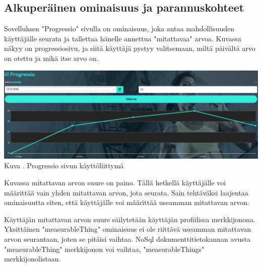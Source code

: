 

\subsection{Alkuperäinen ominaisuus ja parannuskohteet}





Sovelluksen "Progressio"{} sivulla on ominaisuus, 
joka antaa mahdollisuuden käyttäjälle seurata ja tallettaa hänelle annettua "mitattavaa"{} arvoa.
Kuvassa \nextImageCount {} näkyy on progressiosivu, 
ja siitä käyttäjä pystyy valitsemaan, miltä päivältä arvo on otettu ja mikä itse arvo on.
\medskip

\bigskip
\includegraphics[width =15cm]{src/public/progressiosingle.png}\\
Kuva \getImgCount {}. Progressio sivun käyttöliittymä 
\medskip



Kuvassa \theimgCounter {} mitattavan arvon suure on paino. 
% 
Tällä hetkellä käyttäjälle voi määrittää vain yhden mitattavan arvon, jota seurata.
Sain tehtäväksi laajentaa ominaisuutta siten, että käyttäjälle voi määrittää useamman mitattavan arvon.
\medskip


Käyttäjän mitattavan arvon suure säilytetään käyttäjän profiilissa merkkijonona. 
Yksittäinen "measurableThing"{} ominaisuus ei ole riittävä useamman mitattavan arvon seurantaan, joten se pitäisi vaihtaa.
%
NoSql dokumenttitietokannan avusta "measurableThing"{} merkkijonon voi vaihtaa, "measurableThings"{} merkkijonolistaan.
\medskip






